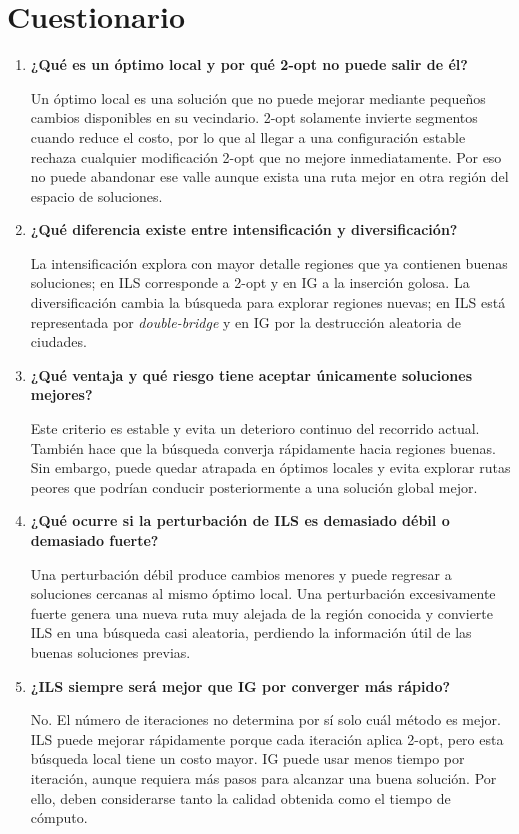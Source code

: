 \documentclass{article}
\begin{document}
\section{Cuestionario}

\begin{enumerate}
    \item \textbf{¿Qué es un óptimo local y por qué 2-opt no puede salir de él?}

    Un óptimo local es una solución que no puede mejorar mediante pequeños cambios
    disponibles en su vecindario. 2-opt solamente invierte segmentos cuando reduce
    el costo, por lo que al llegar a una configuración estable rechaza cualquier
    modificación 2-opt que no mejore inmediatamente. Por eso no puede abandonar
    ese valle aunque exista una ruta mejor en otra región del espacio de soluciones.

    \item \textbf{¿Qué diferencia existe entre intensificación y diversificación?}

    La intensificación explora con mayor detalle regiones que ya contienen buenas
    soluciones; en ILS corresponde a 2-opt y en IG a la inserción golosa. La
    diversificación cambia la búsqueda para explorar regiones nuevas; en ILS está
    representada por \textit{double-bridge} y en IG por la destrucción aleatoria de
    ciudades.

    \item \textbf{¿Qué ventaja y qué riesgo tiene aceptar únicamente soluciones mejores?}

    Este criterio es estable y evita un deterioro continuo del recorrido actual.
    También hace que la búsqueda converja rápidamente hacia regiones buenas. Sin
    embargo, puede quedar atrapada en óptimos locales y evita explorar rutas peores
    que podrían conducir posteriormente a una solución global mejor.

    \item \textbf{¿Qué ocurre si la perturbación de ILS es demasiado débil o demasiado fuerte?}

    Una perturbación débil produce cambios menores y puede regresar a soluciones
    cercanas al mismo óptimo local. Una perturbación excesivamente fuerte genera
    una nueva ruta muy alejada de la región conocida y convierte ILS en una búsqueda
    casi aleatoria, perdiendo la información útil de las buenas soluciones previas.

    \item \textbf{¿ILS siempre será mejor que IG por converger más rápido?}

    No. El número de iteraciones no determina por sí solo cuál método es mejor. ILS
    puede mejorar rápidamente porque cada iteración aplica 2-opt, pero esta búsqueda
    local tiene un costo mayor. IG puede usar menos tiempo por iteración, aunque
    requiera más pasos para alcanzar una buena solución. Por ello, deben considerarse
    tanto la calidad obtenida como el tiempo de cómputo.
\end{enumerate}
\end{document}
